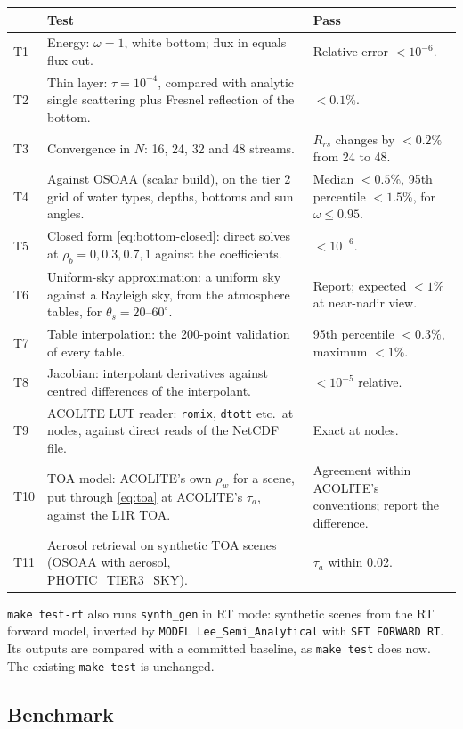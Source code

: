 \documentclass[11pt]{article}
\numberwithin{equation}{section}
\newcommand{\code}[1]{\texttt{#1}}
\begin{document}
\begin{longtable}{@{}p{0.8cm}p{6.4cm}p{7.2cm}@{}}
\toprule
& Test & Pass\\
\midrule
\endhead
T1 & Energy: $\omega=1$, white bottom; flux in equals flux out. & Relative error $<10^{-6}$.\\
T2 & Thin layer: $\tau=10^{-4}$, compared with analytic single scattering plus Fresnel
reflection of the bottom. & $<0.1\%$.\\
T3 & Convergence in $N$: 16, 24, 32 and 48 streams. & $R_{rs}$ changes by $<0.2\%$ from 24
to 48.\\
T4 & Against OSOAA (scalar build), on the tier 2 grid of water types, depths, bottoms and sun
angles. & Median $<0.5\%$, 95th percentile $<1.5\%$, for $\omega\le0.95$.\\
T5 & Closed form \eqref{eq:bottom-closed}: direct solves at $\rho_b = 0, 0.3, 0.7, 1$ against the
coefficients. & $<10^{-6}$.\\
T6 & Uniform-sky approximation: a uniform sky against a Rayleigh sky, from the atmosphere
tables, for $\theta_s = 20$--$60^\circ$. & Report; expected $<1\%$ at near-nadir view.\\
T7 & Table interpolation: the 200-point validation of every table. & 95th percentile $<0.3\%$,
maximum $<1\%$.\\
T8 & Jacobian: interpolant derivatives against centred differences of the interpolant. &
$<10^{-5}$ relative.\\
T9 & ACOLITE LUT reader: \code{romix}, \code{dtott} etc.\ at nodes, against direct reads of the
NetCDF file. & Exact at nodes.\\
T10 & TOA model: ACOLITE's own $\rho_w$ for a scene, put through \eqref{eq:toa} at ACOLITE's
$\tau_a$, against the L1R TOA. & Agreement within ACOLITE's conventions; report the
difference.\\
T11 & Aerosol retrieval on synthetic TOA scenes (OSOAA with aerosol, PHOTIC\_TIER3\_SKY). &
$\tau_a$ within 0.02.\\
\bottomrule
\end{longtable}

\code{make test-rt} also runs \code{synth\_gen} in RT mode: synthetic scenes from the RT
forward model, inverted by \code{MODEL Lee\_Semi\_Analytical} with \code{SET FORWARD RT}. Its
outputs are compared with a committed baseline, as \code{make test} does now. The existing
\code{make test} is unchanged.

\subsection{Benchmark}
\end{document}
